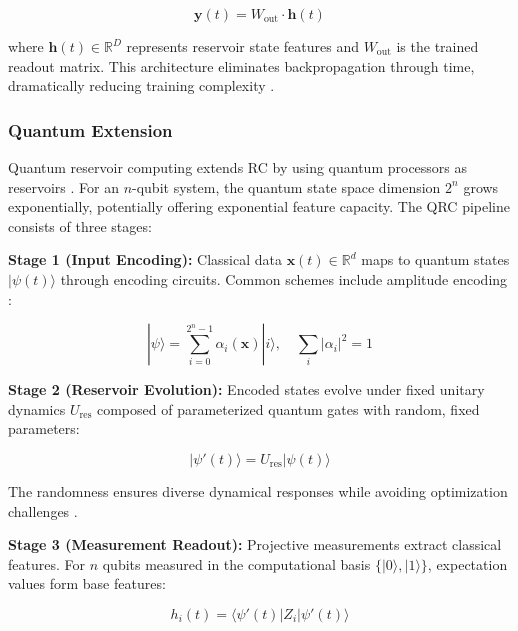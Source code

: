 \documentclass[conference]{IEEEtran}
\begin{document}
\begin{equation}
\mathbf{y}(t) = W_{\text{out}} \cdot \mathbf{h}(t)
\label{eq:rc_output}
\end{equation}

where $\mathbf{h}(t) \in \mathbb{R}^D$ represents reservoir state features and $W_{\text{out}}$ is the trained readout matrix. This architecture eliminates backpropagation through time, dramatically reducing training complexity \cite{lukosevicius2009reservoir, bishop2006pattern, makridakis2018statistical}.

\subsubsection{Quantum Extension}

Quantum reservoir computing extends RC by using quantum processors as reservoirs \cite{fujii2017harnessing}. For an $n$-qubit system, the quantum state space dimension $2^n$ grows exponentially, potentially offering exponential feature capacity. The QRC pipeline consists of three stages:

\textbf{Stage 1 (Input Encoding):} Classical data $\mathbf{x}(t) \in \mathbb{R}^d$ maps to quantum states $|\psi(t)\rangle$ through encoding circuits. Common schemes include amplitude encoding \cite{schuld2021effect}:

\begin{equation}
|\psi\rangle = \sum_{i=0}^{2^n-1} \alpha_i(\mathbf{x}) |i\rangle, \quad \sum_i |\alpha_i|^2 = 1
\label{eq:amplitude_encoding}
\end{equation}

\textbf{Stage 2 (Reservoir Evolution):} Encoded states evolve under fixed unitary dynamics $U_{\text{res}}$ composed of parameterized quantum gates with random, fixed parameters:

\begin{equation}
|\psi'(t)\rangle = U_{\text{res}} |\psi(t)\rangle
\label{eq:reservoir_evolution}
\end{equation}

The randomness ensures diverse dynamical responses while avoiding optimization challenges \cite{cerezo2021variational}.

\textbf{Stage 3 (Measurement Readout):} Projective measurements extract classical features. For $n$ qubits measured in the computational basis $\{|0\rangle, |1\rangle\}$, expectation values form base features:

\begin{equation}
h_i(t) = \langle \psi'(t) | Z_i | \psi'(t) \rangle
\label{eq:pauli_measurement}
\end{equation}
\end{document}
